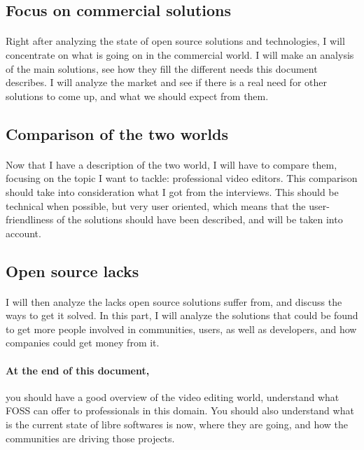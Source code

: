     \subsection{Focus on commercial solutions}
       \paragraph{}
            Right after analyzing the state of open source solutions and
            technologies, I will concentrate on what is going on in the commercial
            world. I will make an analysis of the main solutions, see how they
            fill the different needs this document describes. I will analyze the
            market and see if there is a real need for other solutions to come
            up, and what we should expect from them.

    \subsection{Comparison of the two worlds}
        \paragraph {}
            Now that I have a description of the two world, I will have to compare
            them, focusing on the topic I want to tackle: professional video
            editors. This comparison should take into consideration what I got from
            the interviews. This should be technical when possible, but very user
            oriented, which means that the user-friendliness of the solutions should have
            been described, and will be taken into account.

    \subsection{Open source lacks}
        \paragraph{}
            I will then analyze the lacks open source solutions suffer from,
            and discuss the ways to get it solved. In this part, I will analyze
            the solutions that could be found to get more people involved in
            communities, users, as well as developers, and how companies could get
            money from it.

    \paragraph{At the end of this document,} you should have a good
        overview of the video editing world, understand what FOSS can offer to
        professionals in this domain. You should also understand what is the
        current state of libre softwares is now, where they are going, and how
        the communities are driving those projects.
